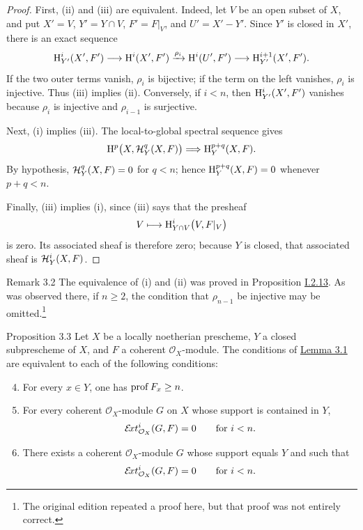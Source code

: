 \begin{proof}
First, (ii) and (iii) are equivalent. Indeed, let $V$ be an open subset of
$X$, and put $X'=V$, $Y'=Y\cap V$, $F'=F|_V$, and $U'=X'-Y'$. Since $Y'$ is
closed in $X'$, there is an exact sequence
\[
  \mathrm H_{Y'}^i(X',F')\longrightarrow \mathrm H^i(X',F')
  \xrightarrow{\rho_i}\mathrm H^i(U',F')
  \longrightarrow\mathrm H_{Y'}^{i+1}(X',F').
\]
If the two outer terms vanish, $\rho_i$ is bijective; if the term on the left
vanishes, $\rho_i$ is injective. Thus (iii) implies (ii). Conversely, if
$i<n$, then $\mathrm H_{Y'}^i(X',F')$ vanishes because $\rho_i$ is injective and
$\rho_{i-1}$ is surjective.

Next, (i) implies (iii). The local-to-global spectral sequence gives
\[
  \mathrm H^p\bigl(X,\mathcal H_Y^q(X,F)\bigr)\Longrightarrow
  \mathrm H_Y^{p+q}(X,F).
\]
By hypothesis, $\mathcal H_Y^q(X,F)=0$ for $q<n$; hence
$\mathrm H_Y^{p+q}(X,F)=0$ whenever $p+q<n$.

Finally, (iii) implies (i), since (iii) says that the presheaf
\[
  V\longmapsto\mathrm H_{Y\cap V}^i\bigl(V,F|_V\bigr)
\]
is zero. Its associated sheaf is therefore zero; because $Y$ is closed, that
associated sheaf is $\mathcal H_Y^i(X,F)$.
\end{proof}



\begin{sgastatement}{Remark 3.2}
The equivalence of (i) and (ii) was proved in Proposition \hyperref[I.2.13]{I.2.13}. As was
observed there, if $n\ge2$, the condition that $\rho_{n-1}$ be injective may
be omitted.\footnote{The original edition repeated a proof here, but that
proof was not entirely correct.}
\end{sgastatement}

\begin{sgastatement}{Proposition 3.3}
Let $X$ be a locally noetherian prescheme, $Y$ a closed subprescheme of $X$,
and $F$ a coherent $\mathcal O_X$-module. The conditions of \hyperref[III.3.1]{Lemma 3.1} are
equivalent to each of the following conditions:
\begin{enumerate}[label=\textup{(\roman*)},leftmargin=2.8em]
\setcounter{enumi}{3}
\item For every $x\in Y$, one has $\operatorname{prof} F_x\ge n$.
\item For every coherent $\mathcal O_X$-module $G$ on $X$ whose support is
contained in $Y$,
\[
  \mathcal E\!xt_{\mathcal O_X}^i(G,F)=0\qquad\text{for }i<n.
\]
\item There exists a coherent $\mathcal O_X$-module $G$ whose support equals
$Y$ and such that
\[
  \mathcal E\!xt_{\mathcal O_X}^i(G,F)=0\qquad\text{for }i<n.
\]
\end{enumerate}
\end{sgastatement}

